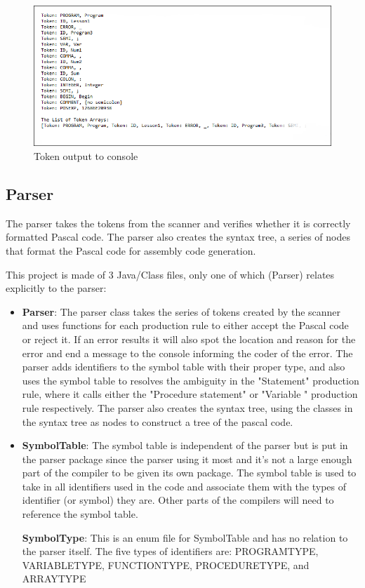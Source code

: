\documentclass[english]{article}
\begin{document}
\begin{figure}
\begin{center}
\includegraphics[width=1.1\textwidth]{output.PNG}
\end{center}
\caption{\label{Output}Token output to console}
\end{figure}


\subsection{Parser}

The parser takes the tokens from the scanner and verifies whether it is correctly formatted Pascal code. The parser also creates the syntax tree, a series of nodes that format the Pascal code for assembly code generation.

This project is made of 3 Java/Class files, only one of which (Parser) relates explicitly to the parser:

\begin{itemize}

\item
\textbf{Parser}: The parser class takes the series of tokens created by the scanner and uses functions for each production rule to either accept the Pascal code or reject it. If an error results it will also spot the location and reason for the error and end a message to the console informing the coder of the error. The parser adds identifiers to the symbol table with their proper type, and also uses the symbol table to resolves the ambiguity in the "Statement" production rule, where it calls either the "Procedure statement" or "Variable " production rule respectively. The parser also creates the syntax tree, using the classes in the syntax tree as nodes to construct a tree of the pascal code.

\item
\textbf{SymbolTable}: The symbol table is independent of the parser but is put in the parser package since the parser using it most and it’s not a large enough part of the compiler to be given its own package. The symbol table is used to take in all identifiers used in the code and associate them with the types of identifier (or symbol) they are. Other parts of the compilers will need to reference the symbol table.

\textbf{SymbolType}: This is an enum file for SymbolTable and has no relation to the parser itself. The five types of identifiers are: PROGRAMTYPE, VARIABLETYPE, FUNCTIONTYPE, PROCEDURETYPE, and ARRAYTYPE

\end{itemize}
\end{document}
